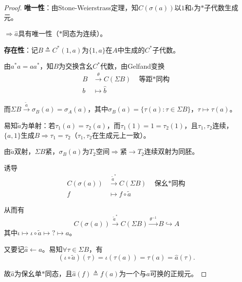 \documentclass[lang=cn,a4paper,newtx,section]{elegantbook}
\begin{document}
\begin{proof}
  \textbf{唯一性}：由Stone-Weierstrass定理，知$C(\sigma(a))$以$1$和$\iota$为$*$子代数生成元。
  
  $\Rightarrow \hat{a}$具有唯一性（$*$同态为连续）。
  
  \textbf{存在性}：记$B \triangleq C^*(1, a)$为$\{1, a\}$在$A$中生成的$C^*$子代数。
  
  由$a^*a = aa^*$，知$B$为交换含幺$C^*$代数，由Gelfand变换
  \begin{equation*}
    \begin{aligned}
      B &\xrightarrow{\theta} C(\Sigma B) \quad \text{等距$*$同构} \\
      b &\longmapsto \hat{b}
    \end{aligned}
  \end{equation*}
  
  而$\Sigma B \xrightarrow{\tilde{a}} \sigma_B(a) = \sigma_A(a)$，其中$\sigma_B(a) = \{\tau(a) : \tau \in \Sigma B\}$，$\tau \mapsto \tau(a)$。
  
  易知$\tilde{a}$为单射：若$\tau_1(a) = \tau_2(a)$，而$\tau_1(1) = 1 = \tau_2(1)$，且$\tau_1, \tau_2$连续，$\{a, 1\}$生成$B \Rightarrow \tau_1 = \tau_2$（$\tau_1, \tau_2$在生成元上一致）。
  
  由$\tilde{a}$双射，$\Sigma B$紧，$\sigma_B(a)$为$T_2$空间$\Rightarrow$紧$\to T_2$连续双射为同胚。
  
  诱导
  \begin{equation*}
    \begin{aligned}
      C(\sigma(a)) &\xrightarrow{\tilde{a}^*} C(\Sigma B) \quad \text{保幺$*$同构} \\
      f &\longmapsto f \circ \tilde{a}
    \end{aligned}
  \end{equation*}
  
  从而有
  \begin{equation*}
    C(\sigma(a)) \xrightarrow{\tilde{a}^*} C(\Sigma B) \xrightarrow{\theta^{-1}} B \hookrightarrow A
  \end{equation*}
  其中$\iota \mapsto \iota \circ \tilde{a} \mapsto ? \mapsto a$。
  
  又要记$\hat{a} \leftarrow a$。易知$\forall \tau \in \Sigma B$，有
  \begin{equation*}
    (\iota \circ \tilde{a})(\tau) = \iota(\tau(a)) = \tau(a) = \hat{a}(\tau).
  \end{equation*}
  
  故$\hat{a}$为保幺单$*$同态，且$\hat{a}(f) \triangleq f(a)$为一个与$a$可换的正规元。
\end{proof}
\end{document}
